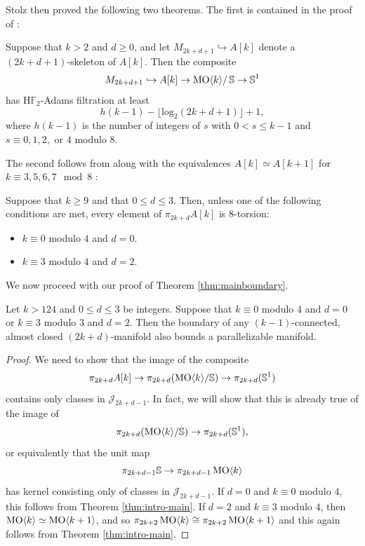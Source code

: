 Stolz then proved the following two theorems. The first is contained in the proof of \cite[Satz 12.7]{StolzBook}:

\begin{thm}\cite[Proof of Satz 12.7]{StolzBook}  \label{thm:Stolz-Adams}
    Suppose that $k>2$ and $d \ge 0$, and let $M_{2k+d+1} \hookrightarrow A[k]$ denote a $(2k+d+1)$-skeleton of $A[k]$. Then the composite \[M_{2k+d+1} \hookrightarrow A[k] \to \mathrm{MO} \langle k \rangle / \operatorname{\mathbb{S}} \to \operatorname{\mathbb{S}}^1\] has $\mathrm{H}\mathbb{F}_2$-Adams filtration at least $$h(k-1)-\lfloor \mathrm{log}_2(2k+d+1) \rfloor +1,$$ where $h(k-1)$ is the number of integers of $s$ with $0<s \le k-1$ and $s \equiv 0,1,2,$ or $4$ modulo $8$.
\end{thm}

The second follows from \cite[Theorem A]{StolzBook} along with the equivalences $A[k] \simeq A[k+1]$ for $k \equiv 3,5,6,7 \mod 8$ \cite[Satz 3.1(ii)]{StolzBook}:

\begin{thm} \label{thm:Stolz-8torsion}
Suppose that $k \ge 9$ and that $0 \le d \le 3$.  Then, unless one of the following conditions are met, every element of $\pi_{2k+d} A[k]$ is $8$-torsion:
\begin{itemize}
\item $k \equiv 0$ modulo $4$ and $d=0$.
\item $k \equiv 3$ modulo $4$ and $d=2$.
\end{itemize}
\end{thm}

We now proceed with our proof of Theorem \ref{thm:mainboundary}.

\begin{thm} \label{thm:strongmainboundary}
Let $k>124$ and $0 \le d \le 3$ be integers.  Suppose that $k \equiv 0$ modulo $4$ and $d=0$ or $k \equiv 3$ modulo $3$ and $d=2$.  Then the boundary of any $(k-1)$-connected, almost closed $(2k+d)$-manifold also bounds a parallelizable manifold.
\end{thm}

\begin{proof}
We need to show that the image of the composite
$$\pi_{2k+d} A[k] \to \pi_{2k+d}(\operatorname{\mathrm{MO}} \langle k \rangle/\mathbb{S}) \to \pi_{2k+d}(\mathbb{S}^1)$$
contains only classes in $\mathcal{J}_{2k+d-1}$.  In fact, we will show that this is already true of the image of
$$\pi_{2k+d}(\operatorname{\mathrm{MO}} \langle k \rangle/\mathbb{S}) \to \pi_{2k+d}(\mathbb{S}^1),$$
or equivalently that the unit map
$$\pi_{2k+d-1} \mathbb{S} \to \pi_{2k+d-1} \operatorname{\mathrm{MO}} \langle k \rangle$$
has kernel consisting only of classes in $\mathcal{J}_{2k+d-1}$.  If $d=0$ and $k \equiv 0$ modulo $4$, this follows from Theorem \ref{thm:intro-main}.  If $d=2$ and $k \equiv 3$ modulo $4$, then $\operatorname{\mathrm{MO}} \langle k \rangle \simeq \operatorname{\mathrm{MO}} \langle k+1 \rangle$, and so $\pi_{2k+2} \operatorname{\mathrm{MO}} \langle k \rangle \cong \pi_{2k+2} \operatorname{\mathrm{MO}} \langle k+1 \rangle$ and this again follows from Theorem \ref{thm:intro-main}.
\end{proof}

